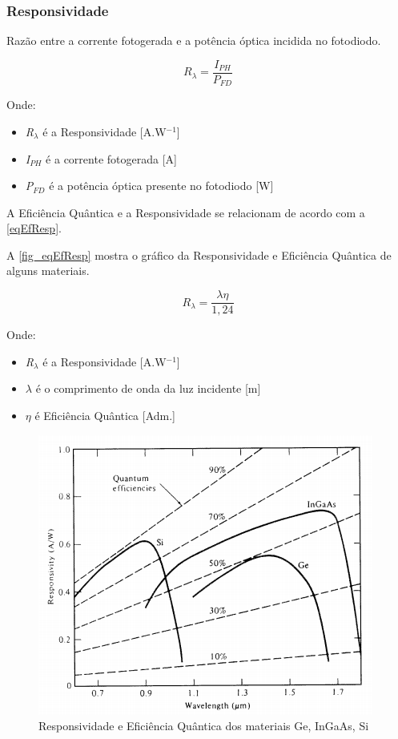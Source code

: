 \subsubsection{Responsividade}
Razão entre a corrente fotogerada e a potência óptica incidida no fotodiodo.

\begin{equation}
    \label{eq_responsividade}
    R_\lambda = \frac{I_{PH}}{P_{FD}}
\end{equation}

Onde:
\begin{itemize}
    \item \emph{R$_\lambda$} \'e a Responsividade [A.W$^{-1}$]
    \item \emph{I$_{PH}$} \'e a corrente fotogerada [A]
    \item \emph{P$_{FD}$} \'e a pot\^encia \'optica presente no fotodiodo [W]
\end{itemize}

A Eficiência Quântica e a Responsividade se relacionam de acordo com a \autoref{eqEfResp}.

A \autoref{fig_eqEfResp} mostra o gráfico da Responsividade e Efici\^encia Qu\^antica de alguns materiais.

\begin{equation}
    \label{eqEfResp}
    R_\lambda = \frac{\lambda\eta}{1,24}
\end{equation}

Onde:
\begin{itemize}
    \item \emph{R$_\lambda$} \'e a Responsividade [A.W$^{-1}$]
    \item $\lambda$ \'e o comprimento de onda da luz incidente [m]
    \item $\eta$ \'e Efici\^encia Qu\^antica [Adm.]
\end{itemize}

\begin{figure}[htb]
	\caption{\label{fig_responsividade}Responsividade e Efici\^encia Qu\^antica dos materiais Ge, InGaAs, Si}
	\begin{center}
	    \includegraphics[scale=0.8]{Imagens/GraficoRespostaEspectral.png}
	\end{center}
	\label{fig_eqEfResp}
\end{figure}


